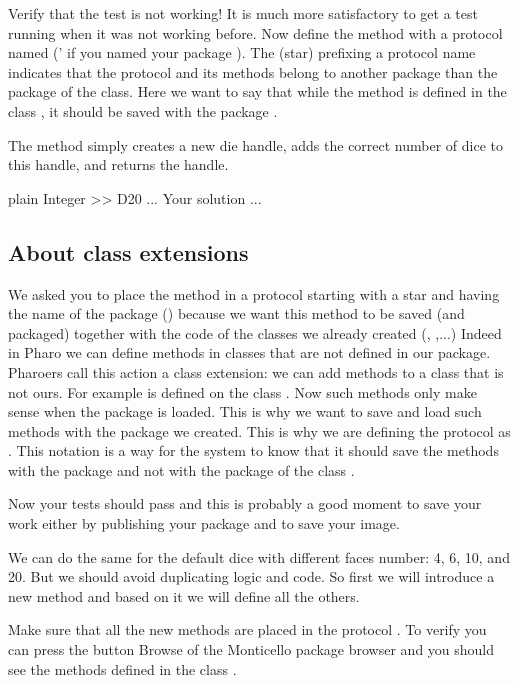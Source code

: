 \documentclass[10pt,twoside,english]{_support/latex/sbabook/sbabook}
\begin{document}
Verify that the test is not working! It is much more satisfactory to get a test running when it was not working before. Now define the method  with a protocol named  (' if you named your package ).
The \textcode{*} (star) prefixing a protocol name indicates that the protocol and its methods belong to another package than the package of the class. Here we want to say that while the method  is defined in the class , it should be saved with the package . 
 
The method  simply creates a new die handle, adds the correct number of dice to this handle, and returns the handle.

\begin{displaycode}{plain}
Integer >> D20
	... Your solution ...
\end{displaycode}
\subsection{About class extensions}
We asked you to place the method  in a protocol starting with a star and having the name of the package () because we want this method to be saved (and packaged) together with the code of the classes we already created (, ,...) 
Indeed in Pharo we can define methods in classes that are not defined in our package. Pharoers call this action a class extension: we can add methods to a class that is not ours. For example  is defined on the class . Now such methods only make sense when the package  is loaded. 
This is why we want to save and load such methods with the package we created. This is why we are defining the protocol as .
This notation is a way for the system to know that it should save the methods with the package and not with the package of the class . 

Now your tests should pass and this is probably a good moment to save your work either by publishing your package and to save your image. 

We can do the same for the default dice with different faces number: 4, 6, 10, and 20. But we should avoid duplicating logic and code. So first we will introduce a new method  and based on it we will define all the others.

Make sure that all the new methods are placed in the protocol . To verify you can press the button Browse of the Monticello package browser and you should see the methods defined in the class . 
\end{document}
